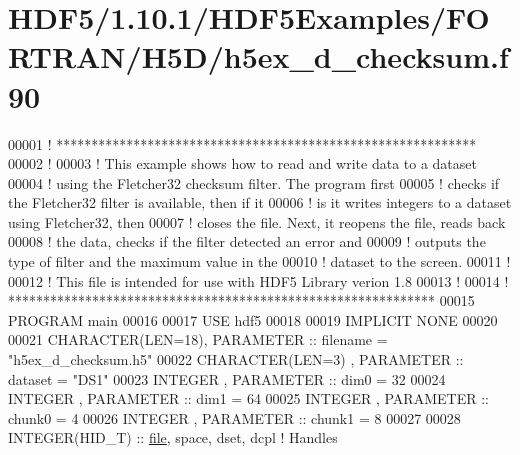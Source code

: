 \hypertarget{_h_d_f5_21_810_81_2_h_d_f5_examples_2_f_o_r_t_r_a_n_2_h5_d_2h5ex__d__checksum_8f90_source}{}\section{H\+D\+F5/1.10.1/\+H\+D\+F5\+Examples/\+F\+O\+R\+T\+R\+A\+N/\+H5\+D/h5ex\+\_\+d\+\_\+checksum.f90}
\label{_h_d_f5_21_810_81_2_h_d_f5_examples_2_f_o_r_t_r_a_n_2_h5_d_2h5ex__d__checksum_8f90_source}

\begin{DoxyCode}
00001 \textcolor{comment}{! ************************************************************}
00002 \textcolor{comment}{!}
00003 \textcolor{comment}{!  This example shows how to read and write data to a dataset}
00004 \textcolor{comment}{!  using the Fletcher32 checksum filter.  The program first}
00005 \textcolor{comment}{!  checks if the Fletcher32 filter is available, then if it}
00006 \textcolor{comment}{!  is it writes integers to a dataset using Fletcher32, then}
00007 \textcolor{comment}{!  closes the file.  Next, it reopens the file, reads back}
00008 \textcolor{comment}{!  the data, checks if the filter detected an error and}
00009 \textcolor{comment}{!  outputs the type of filter and the maximum value in the}
00010 \textcolor{comment}{!  dataset to the screen.}
00011 \textcolor{comment}{!}
00012 \textcolor{comment}{!  This file is intended for use with HDF5 Library verion 1.8}
00013 \textcolor{comment}{!}
00014 \textcolor{comment}{! *************************************************************}
00015 \textcolor{keyword}{PROGRAM} main
00016 
00017   \textcolor{keywordtype}{USE }hdf5
00018 
00019   \textcolor{keywordtype}{IMPLICIT NONE}
00020 
00021   \textcolor{keywordtype}{CHARACTER(LEN=18)}, \textcolor{keywordtype}{PARAMETER} :: filename = \textcolor{stringliteral}{"h5ex\_d\_checksum.h5"}
00022   \textcolor{keywordtype}{CHARACTER(LEN=3)} , \textcolor{keywordtype}{PARAMETER} :: dataset  = \textcolor{stringliteral}{"DS1"}
00023   \textcolor{keywordtype}{INTEGER}          , \textcolor{keywordtype}{PARAMETER} :: dim0     = 32
00024   \textcolor{keywordtype}{INTEGER}          , \textcolor{keywordtype}{PARAMETER} :: dim1     = 64
00025   \textcolor{keywordtype}{INTEGER}          , \textcolor{keywordtype}{PARAMETER} :: chunk0   = 4
00026   \textcolor{keywordtype}{INTEGER}          , \textcolor{keywordtype}{PARAMETER} :: chunk1   = 8
00027   
00028   \textcolor{keywordtype}{INTEGER(HID\_T)}  :: \hyperlink{structfile}{file}, space, dset, dcpl \textcolor{comment}{! Handles}

\end{DoxyCode}
